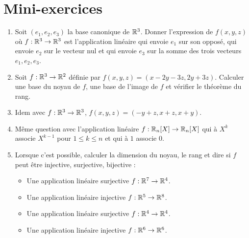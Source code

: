 \section{Mini-exercices}

\begin{frame}
\begin{miniexercice}
\begin{enumerate}
  \item Soit $(e_1,e_2,e_3)$ la base canonique de $\mathbb{R}^3$. Donner l'expression
  de $f(x,y,z)$ où $f : \mathbb{R}^3 \to \mathbb{R}^3$
  est l'application linéaire 
  qui envoie $e_1$ sur son opposé,
  qui envoie $e_2$ sur le vecteur nul et
  qui envoie $e_3$ sur la somme des trois vecteurs $e_1, e_2, e_3$.
  
  \item Soit $f : \mathbb{R}^3 \to \mathbb{R}^2$ définie par $f(x,y,z)=(x-2y-3z,2y+3z)$.
  Calculer une base du noyau de $f$, une base de l'image de $f$ et vérifier le théorème du rang.
  
  \item Idem avec $f : \mathbb{R}^3 \to \mathbb{R}^3$, $f(x,y,z)=(-y+z,x+z,x+y)$.
  
  \item Même question avec l'application linéaire $f : \mathbb{R}_n[X] \to \mathbb{R}_n[X]$ qui à 
  $X^k$ associe $X^{k-1}$ pour $1 \le k \le n$ et qui à $1$ associe $0$.
  
  \item Lorsque c'est possible, calculer la dimension du noyau, le rang et dire 
  si $f$ peut être injective, surjective, bijective :
  \vspace*{-0.5ex}
    \begin{itemize}
      \item Une application linéaire surjective $f : \mathbb{R}^7 \to \mathbb{R}^4$.
      \item Une application linéaire injective $f : \mathbb{R}^5 \to \mathbb{R}^8$.
      \item Une application linéaire surjective $f : \mathbb{R}^4 \to \mathbb{R}^4$.
      \item Une application linéaire injective $f : \mathbb{R}^6 \to \mathbb{R}^6$.      
    \end{itemize}

\vspace*{-1ex}  
\end{enumerate}

\end{miniexercice}

\end{frame}

